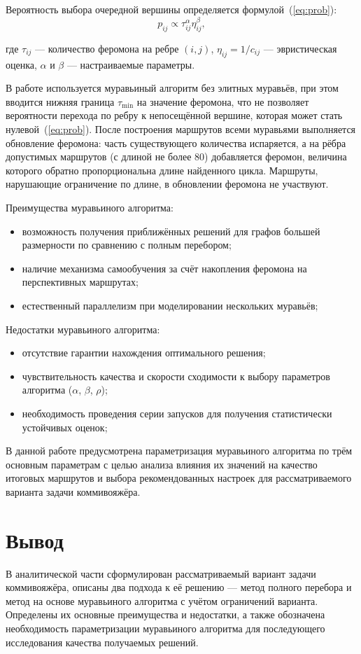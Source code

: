 Вероятность выбора очередной вершины определяется формулой~(\ref{eq:prob}):
\begin{equation}
	p_{ij} \propto \tau_{ij}^{\alpha} \eta_{ij}^{\beta},
	\label{eq:prob}
\end{equation}

где \(\tau_{ij}\) --- количество феромона на ребре \((i,j)\), \(\eta_{ij} = 1 / c_{ij}\) --- эвристическая оценка, \(\alpha\) и \(\beta\) --- настраиваемые параметры.

В работе используется муравьиный алгоритм без элитных муравьёв, при этом вводится нижняя граница \(\tau_{\min}\) на значение феромона, что не позволяет вероятности перехода по ребру к непосещённой вершине, которая может стать нулевой~(\ref{eq:prob}). После построения маршрутов всеми муравьями выполняется обновление феромона: часть существующего количества испаряется, а на рёбра допустимых маршрутов (с длиной не более 80) добавляется феромон, величина которого обратно пропорциональна длине найденного цикла. Маршруты, нарушающие ограничение по длине, в обновлении феромона не участвуют.

Преимущества муравьиного алгоритма:
\begin{itemize}
	\item возможность получения приближённых решений для графов большей размерности по сравнению с полным перебором;
	\item наличие механизма самообучения за счёт накопления феромона на перспективных маршрутах;
	\item естественный параллелизм при моделировании нескольких муравьёв;
\end{itemize}

Недостатки муравьиного алгоритма:
\begin{itemize}
	\item отсутствие гарантии нахождения оптимального решения;
	\item чувствительность качества и скорости сходимости к выбору параметров алгоритма (\(\alpha\), \(\beta\), \(\rho\));
	\item необходимость проведения серии запусков для получения статистически устойчивых оценок;
\end{itemize}

В данной работе предусмотрена параметризация муравьиного алгоритма по трём основным параметрам с целью анализа влияния их значений на качество итоговых маршрутов и выбора рекомендованных настроек для рассматриваемого варианта задачи коммивояжёра.

\section{Вывод}

В аналитической части сформулирован рассматриваемый вариант задачи коммивояжёра, описаны два подхода к её решению --- метод полного перебора и метод на основе муравьиного алгоритма с учётом ограничений варианта. Определены их основные преимущества и недостатки, а также обозначена необходимость параметризации муравьиного алгоритма для последующего исследования качества получаемых решений.
